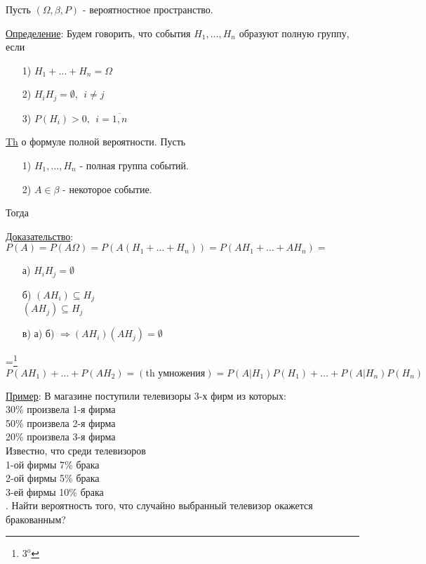 
Пусть $(\Omega, \beta, P)$ - вероятностное пространство.

\underline{Определение}: Будем говорить, что события $H_1, \ldots , H_n$ образуют полную группу, если \\
\begin{enumerate}
	\item[1)]
	$H_1 + \ldots + H_n = \Omega$ \\
	
	\item[2)]
	$H_i H_j = \emptyset, \ \ i \neq j$ \\
	
	\item[3)]
	$P(H_i) > 0, \ \ i = \overline{1,n}$ \\
\end{enumerate}


\underline{Th} о формуле полной вероятности.
Пусть
\begin{enumerate}
	\item[1)] 
	$H_1, \ldots, H_n$ - полная группа событий.
	
	\item[2)]
	$A \in \beta$ - некоторое событие.
\end{enumerate}
Тогда \\

\underline{Доказательство}:
$P(A) = P(A \Omega) = P(A (H_1 + \ldots + H_n)) = P(AH_1 + \ldots + AH_n) = $
\begin{enumerate}
	\item[а)] 
	$H_i H_j = \emptyset$ 
	
	\item[б)]
	$(AH_i) \subseteq H_j$ \\
	$(AH_j) \subseteq H_j$ \\
	
	\item[в)]
	а) б) $\Rightarrow (AH_i)(AH_j) = \emptyset$
\end{enumerate}
 =\footnote{ $3^o$ } $P(AH_1) + \ldots + P(AH_2) = (\text{th умножения}) = P(A|H_1) P(H_1) + \ldots + P(A|H_n) P(H_n)$
 
\underline{Пример}: В магазине поступили телевизоры 3-х фирм из которых: \\
30\% произвела 1-я фирма \\
50\% произвела 2-я фирма \\
20\% произвела 3-я фирма \\
Известно, что среди телевизоров \\
1-ой фирмы 7\% брака \\
2-ой фирмы 5\% брака \\
3-ей фирмы 10\% брака \\.
Найти вероятность того, что случайно выбранный телевизор окажется бракованным? \\

